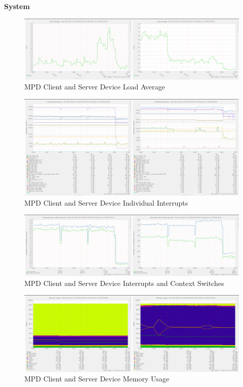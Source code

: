 \documentclass[11pt,a4paper]{scrreprt}
\begin{document}
\textbf{System}

\begin{figure}[H]
\includegraphics{ResultsAndAnalysis/MPDServerTestImages/015MPDLoadAverage.png}
\centering
\caption{MPD Client and Server Device Load Average}
\label{MPDLoadAvg}
\end{figure}

\begin{figure}[H]
\includegraphics{ResultsAndAnalysis/MPDServerTestImages/013MPDIndividualInterrupts.png}
\centering
\caption{MPD Client and Server Device Individual Interrupts}
\label{MPDIndInt}
\end{figure}

\begin{figure}[H]
\includegraphics{ResultsAndAnalysis/MPDServerTestImages/014MPDInterruptsAndContextSwitches.png}
\centering
\caption{MPD Client and Server Device Interrupts and Context Switches}
\label{MPDIntCont}
\end{figure}

\begin{figure}[H]
\includegraphics{ResultsAndAnalysis/MPDServerTestImages/016MPDMemoryUsage.png}
\centering
\caption{MPD Client and Server Device Memory Usage}
\label{MPDMemUse}
\end{figure}
\end{document}
